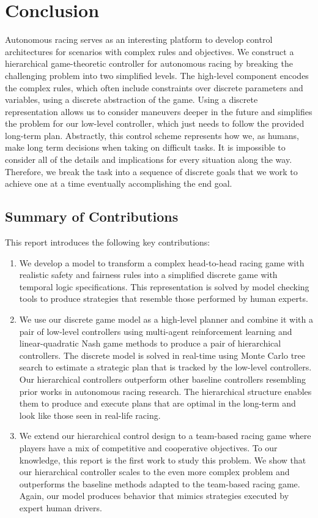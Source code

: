 \chapter{Conclusion} \label{chapter:conclusion}
Autonomous racing serves as an interesting platform to develop control architectures for scenarios with complex rules and objectives. We construct a hierarchical game-theoretic controller for autonomous racing by breaking the challenging problem into two simplified levels. The high-level component encodes the complex rules, which often include constraints over discrete parameters and variables, using a discrete abstraction of the game. Using a discrete representation allows us to consider maneuvers deeper in the future and simplifies the problem for our low-level controller, which just needs to follow the provided long-term plan. Abstractly, this control scheme represents how we, as humans, make long term decisions when taking on difficult tasks. It is impossible to consider all of the details and implications for every situation along the way. Therefore, we break the task into a sequence of discrete goals that we work to achieve one at a time eventually accomplishing the end goal. 

\section{Summary of Contributions}
This report introduces the following key contributions:
\begin{enumerate}
    \item We develop a model to transform a complex head-to-head racing game with realistic safety and fairness rules into a simplified discrete game with temporal logic specifications. This representation is solved by model checking tools to produce strategies that resemble those performed by human experts.
    
    \item We use our discrete game model as a high-level planner and combine it with a pair of low-level controllers using multi-agent reinforcement learning and linear-quadratic Nash game methods to produce a pair of hierarchical controllers. The discrete model is solved in real-time using Monte Carlo tree search to estimate a strategic plan that is tracked by the low-level controllers. Our hierarchical controllers outperform other baseline controllers resembling prior works in autonomous racing research. The hierarchical structure enables them to produce and execute plans that are optimal in the long-term and look like those seen in real-life racing.
    
    \item We extend our hierarchical control design to a team-based racing game where players have a mix of competitive and cooperative objectives. To our knowledge, this report is the first work to study this problem. We show that our hierarchical controller scales to the even more complex problem and outperforms the baseline methods adapted to the team-based racing game. Again, our model produces behavior that mimics strategies executed by expert human drivers.
\end{enumerate}
